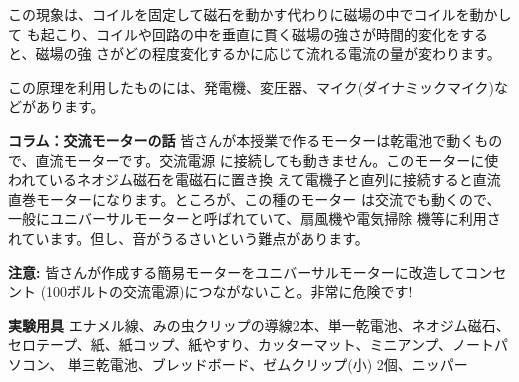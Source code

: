 この現象は、コイルを固定して磁石を動かす代わりに磁場の中でコイルを動かして
も起こり、コイルや回路の中を垂直に貫く磁場の強さが時間的変化をすると、磁場の強
さがどの程度変化するかに応じて流れる電流の量が変わります。

この原理を利用したものには、発電機、変圧器、マイク(ダイナミックマイク)などがあります。


\bigskip

\begin{itembox}[l]{\bf コラム：交流モーターの話}
皆さんが本授業で作るモーターは乾電池で動くもので、直流モーターです。交流電源
に接続しても動きません。このモーターに使われているネオジム磁石を電磁石に置き換
えて電機子と直列に接続すると直流直巻モーターになります。ところが、この種のモーター
は交流でも動くので、一般にユニバーサルモーターと呼ばれていて、扇風機や電気掃除
機等に利用されています。但し、音がうるさいという難点があります。

{\bf 注意:} 皆さんが作成する簡易モーターをユニバーサルモーターに改造してコンセント 
(100ボルトの交流電源)につながないこと。非常に危険です!
\end{itembox}



\newpage

\jikken

\begin{itemsquarebox}[c]{\bf 実験用具}
エナメル線、みの虫クリップの導線2本、単一乾電池、ネオジム磁石、
セロテープ、紙、紙コップ、紙やすり、カッターマット、ミニアンプ、ノートパソコン、
単三乾電池、ブレッドボード、ゼムクリップ(小) 2個、ニッパー
\end{itemsquarebox}

\bigskip


